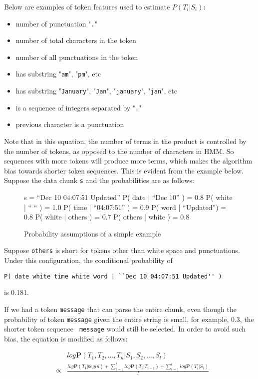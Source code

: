 Below are examples of token features used to estimate
$P(T_i|S_i)$:

\begin{itemize}
\item number of punctuation "{\tt .}"
\item number of total characters in the token
\item number of all punctuations in the token
\item has substring "{\tt am}", "{\tt pm}", etc
\item has substring "{\tt January}", "{\tt Jan}", "{\tt january}",
"{\tt jan}", etc
\item is a sequence of integers separated by "{\tt .}"
\item previous character is a punctuation
\end{itemize}

Note that in this equation, the number of terms in the product is
controlled by the number of tokens, as opposed to the number of
characters in HMM. So sequences with more tokens will produce more terms, 
which makes the algorithm bias towards shorter token sequences. 
This is evident from the example below.
Suppose the data chunk {\tt s} and the probabilities are as
follows:

\begin{figure}[t]
\begin{centercode}
s  = ``Dec 10 04:07:51 Updated''
P( date | ``Dec 10'' ) = 0.8
P( white | `` `` ) = 1.0
P( time | ``04:07:51'' ) = 0.9
P( word | ``Updated'') = 0.8
P( white | others ) = 0.7
P( others | white ) = 0.8
\end{centercode}
\caption{Probability assumptions of a simple example}
\end{figure}

Suppose {\tt others} is short for tokens other than white space and
punctuations. Under this configuration, the conditional probability
of
\begin{verbatim}
P( date white time white word | ``Dec 10 04:07:51 Updated'' ) 
\end{verbatim}
is 0.181.

If we had a token {\tt message} that can parse the entire chunk,
even though the probability of token {\tt message} given the entire
string is small, for example, 0.3, the shorter token sequence {\tt
message} would still be selected. In order to avoid such bias, the
equation is modified as follows:

\begin{eqnarray*}
&& log \mathbf{P}(T_1, T_2, ..., T_n|S_1, S_2, ..., S_l) \\ 
& \propto & \frac{log \mathbf{P}(T_1|begin) +
\sum_{i=2}^{l}log \mathbf{P}(T_i|T_{i-1}) + \sum_{i=1}^{l}log
\mathbf{P}(T_i|S_i)}{l}
\end{eqnarray*}

